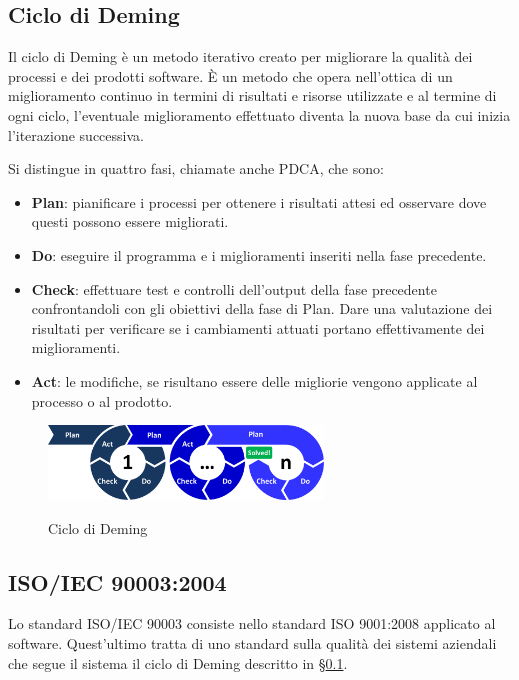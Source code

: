 	\subsection{Ciclo di Deming}	\label{cicloDeming}
	Il ciclo di Deming è un metodo iterativo creato per migliorare la qualità dei processi e dei prodotti software. È un metodo che opera nell'ottica di un miglioramento continuo in termini di risultati e risorse utilizzate e al termine di ogni ciclo, l'eventuale miglioramento effettuato diventa la nuova base da cui inizia l'iterazione successiva.
	
	Si distingue in quattro fasi, chiamate anche PDCA, che sono:
	
	\begin{itemize}
		\item \textbf{Plan}: pianificare i processi per ottenere i risultati attesi ed osservare dove questi possono essere migliorati.
		\item \textbf{Do}: eseguire il programma e i miglioramenti inseriti nella fase precedente.
		\item \textbf{Check}: effettuare test e controlli dell'output della fase precedente confrontandoli con gli obiettivi della fase di Plan. Dare una valutazione dei risultati per verificare se i cambiamenti attuati portano effettivamente dei miglioramenti.
		\item \textbf{Act}: le modifiche, se risultano essere delle migliorie vengono applicate al processo o al prodotto.
	\end{itemize}

	\begin{figure}[H]
		\centering
		\includegraphics[width=0.65\textwidth]{img/PDCA}
		\label{fig:PDCA}
		\caption[Ciclo di Deming]{Ciclo di Deming\protect\footnotemark}
	\end{figure}


	\subsection{ISO/IEC 90003:2004}
	Lo standard ISO/IEC 90003 consiste nello standard ISO 9001:2008 applicato al software. Quest'ultimo tratta di uno standard sulla qualità dei sistemi aziendali che segue il sistema il ciclo di Deming descritto in \S\ref{cicloDeming}.
	
